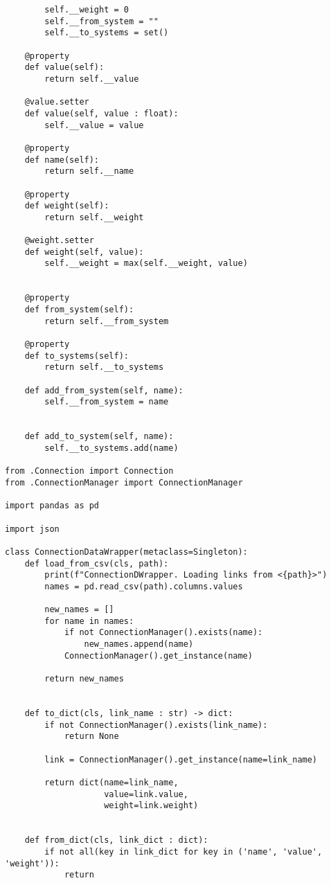 \begin{lstlisting}
        self.__weight = 0
        self.__from_system = ""
        self.__to_systems = set()
    
    @property
    def value(self):
        return self.__value

    @value.setter
    def value(self, value : float):
        self.__value = value
    
    @property
    def name(self):
        return self.__name

    @property
    def weight(self):
        return self.__weight
    
    @weight.setter
    def weight(self, value):
        self.__weight = max(self.__weight, value)
    
    
    @property
    def from_system(self):
        return self.__from_system
    
    @property
    def to_systems(self):
        return self.__to_systems
    
    def add_from_system(self, name):
        self.__from_system = name
        
        
    def add_to_system(self, name):
        self.__to_systems.add(name)
        
from .Connection import Connection
from .ConnectionManager import ConnectionManager

import pandas as pd

import json

class ConnectionDataWrapper(metaclass=Singleton):
    def load_from_csv(cls, path):
        print(f"ConnectionDWrapper. Loading links from <{path}>")
        names = pd.read_csv(path).columns.values
        
        new_names = []
        for name in names:
            if not ConnectionManager().exists(name):
                new_names.append(name)
            ConnectionManager().get_instance(name)
            
        return new_names
    
    
    def to_dict(cls, link_name : str) -> dict:
        if not ConnectionManager().exists(link_name):
            return None
        
        link = ConnectionManager().get_instance(name=link_name)
        
        return dict(name=link_name, 
                    value=link.value,
                    weight=link.weight)
    
    
    def from_dict(cls, link_dict : dict):
        if not all(key in link_dict for key in ('name', 'value', 'weight')):
            return
        

\end{lstlisting}
